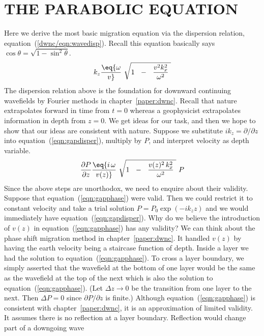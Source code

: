 \section{THE PARABOLIC EQUATION}
Here we derive the most basic migration equation
via the dispersion relation,
equation~(\ref{dwnc/eqn:wavedisp}).
Recall this equation basically says $\cos\theta=\sqrt{1-\sin^2\theta}$.
\begin{equation}
k_z  \eq 
{ \omega     \over v} \
\sqrt{
        1  \ \ -\ \  {v^2k_x^2 \over   \omega^2 } \ 
        }
\label{eqn:gapdisper}
\end{equation}
The dispersion relation above is the foundation
for downward continuing wavefields by Fourier
methods in chapter~\ref{paper:dwnc}.
Recall that nature extrapolates forward in time from $t=0$
whereas a geophysicist extrapolates information
in depth from $z=0$.
We get ideas for our task,
and then we hope to show that our ideas are
consistent with nature.
Suppose we substitute $ik_z=\partial/\partial z$
into equation~(\ref{eqn:gapdisper}), multiply by $P$,
and interpret velocity as depth variable.
\begin{equation}
{\partial P   \over  \partial z }  \eq 
{ i \, \omega     \over v(z)} \
\sqrt{
        1  \ \ -\ \  {v(z)^2\, k_x^2 \over   \omega^2 } \ 
        }
\ P
\label{eqn:gapphase}
\end{equation}
Since the above steps are unorthodox,
we need to enquire about their validity.
Suppose that equation~(\ref{eqn:gapphase}) were valid.
Then we could restrict it to constant velocity
and take a trial solution $P=P_0\exp(-ik_z z)$ and we
would immediately have equation~(\ref{eqn:gapdisper}).
Why do we believe the introduction of $v(z)$ in
equation~(\ref{eqn:gapphase}) has any validity?
We can think about the phase shift migration method
in chapter~\ref{paper:dwnc}.
It handled $v(z)$ by having the earth velocity
being a staircase function of depth.
Inside a layer we had the solution to
equation~(\ref{eqn:gapphase}).
To cross a layer boundary,
we simply asserted that the wavefield at the bottom
of one layer would be the same as the wavefield
at the top of the next
which is also the solution to
equation~(\ref{eqn:gapphase}).
(Let $\Delta z \rightarrow 0$
be the transition from one layer to the next.
Then $\Delta P=0$ since $\partial P/\partial z$ is finite.)
Although equation~(\ref{eqn:gapphase}) is consistent
with chapter~\ref{paper:dwnc},
it is an approximation of limited validity.
It assumes there is no reflection at a layer boundary.
Reflection would change part of a downgoing wave
